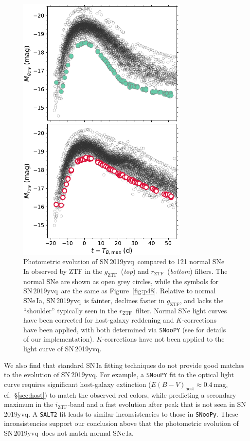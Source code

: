 \documentclass[twocolumn]{aastex63}
\newcommand{\rztf}{$r_\mathrm{ZTF}$}
\newcommand{\gztf}{$g_\mathrm{ZTF}$}
\newcommand{\iztf}{$i_\mathrm{ZTF}$}
\newcommand{\sn}{SN\,2019yvq}
\begin{document}
\begin{figure}
    \centering
    \includegraphics[width=3.35in]{./figures/abs_mag_host_ebv_kcorr.pdf}
    \caption{Photometric evolution of \sn\ compared to 121 normal SNe\,Ia
    observed by ZTF \citep{Yao19} in the \gztf\ (\textit{top}) and \rztf\
    (\textit{bottom}) filters. The normal SNe are shown as open grey circles,
    while the symbols for \sn\ are the same as Figure~\ref{fig:p48}. Relative
    to normal SNe\,Ia, \sn\ is fainter, declines faster in \gztf, and lacks
    the ``shoulder'' typically seen in the \rztf\ filter. Normal SNe light
    curves have been corrected for host-galaxy reddening and $K$-corrections
    have been applied, with both determined via \texttt{SNooPY} (see
    \citealt{Bulla20} for details of our implementation). $K$-corrections have
    not been applied to the light curve of \sn.}
    \label{fig:lc_comp}
\end{figure}


We also find that standard SN\,Ia fitting techniques do not provide good
matches to the evolution of \sn. For example, a \texttt{SNooPY}
\citep{Burns11} fit to the optical light curve requires significant
host-galaxy extinction ($E(B-V)_\mathrm{host}\approx0.4$\,mag, cf.\
\S\ref{sec:host}) to match the observed red colors, while predicting a
secondary maximum in the \iztf-band and a fast evolution after peak that is
not seen in \sn. A \texttt{SALT2} \citep{Guy07} fit leads to similar
inconsistencies to those in \texttt{SNooPy}. These inconsistencies support our
conclusion above that the photometric evolution of \sn\ does not match normal
SNe\,Ia.
\end{document}
